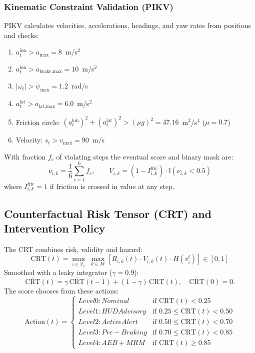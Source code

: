 \documentclass[preprint,12pt]{elsarticle}
\begin{document}
\subsubsection{Kinematic Constraint Validation (PIKV)}
PIKV calculates velocities, accelerations, headings, and yaw rates from positions and checks:
\begin{enumerate}
    \item $a^{\text{lon}}_t > a_{\max} = 8$~m/s$^2$
    \item $a^{\text{lon}}_t > a_{\text{brake,max}} = 10$~m/s$^2$
    \item $|\omega_t| > \dot{\psi}_{\max} = 1.2$~rad/s
    \item $a^{\text{lat}}_t > a_{\text{lat,max}} = 6.0$~m/s$^2$
    \item Friction circle: $(a^{\text{lon}}_t)^2 + (a^{\text{lat}}_t)^2 > (\mu g)^2 = 47.16$~m$^2$/s$^4$ ($\mu = 0.7$)
    \item Velocity: $s_t > v_{\max} = 90$~m/s
\end{enumerate}
With fraction $f_c$ of violating steps the eventual score and binary mask are:
\begin{equation}
    \nu_{i,k} = \frac{1}{6} \sum_{c=1}^{6} f_c, \qquad
    V_{i,k} = (1 - I^{\text{fric}}_{i,k}) \cdot \mathbb{I}(\nu_{i,k} < 0.5)
    \label{eq_validity}
\end{equation}
where $I^{\text{fric}}_{i,k} = 1$ if friction is crossed in value at any step.

\subsection{Counterfactual Risk Tensor (CRT) and Intervention Policy}
The CRT combines risk, validity and hazard:
\begin{equation}
    \text{CRT}(t) = \max_{i \in \mathcal{V}_t} \; \max_{k \in \mathcal{M}} \left[R_{i,k}(t) \cdot V_{i,k}(t) \cdot H(v_i^t)\right] \in [0, 1]
    \label{eq_crt}
\end{equation}
Smoothed with a leaky integrator ($\gamma=0.9$):
\begin{equation}
    \overline{\text{CRT}}(t) = \gamma \, \overline{\text{CRT}}(t-1) + (1 - \gamma) \, \text{CRT}(t), \quad \overline{\text{CRT}}(0) = 0.
    \label{eq_smooth}
\end{equation}
The score chooses from these actions:
\begin{equation}
    \text{Action}(t) = \begin{cases}
    {Level 0: Nominal} & \text{if } \text{CRT}(t) < 0.25 \\
    {Level 1: HUD Advisory} & \text{if } 0.25 \le \text{CRT}(t) < 0.50 \\
    {Level 2: Active Alert} & \text{if } 0.50 \le \text{CRT}(t) < 0.70 \\
    {Level 3: Pre-Braking} & \text{if } 0.70 \le \text{CRT}(t) < 0.85 \\
    {Level 4: AEB + MRM} & \text{if } \text{CRT}(t) \ge 0.85
    \end{cases}
    \label{eq_intervention}
\end{equation}
\end{document}
